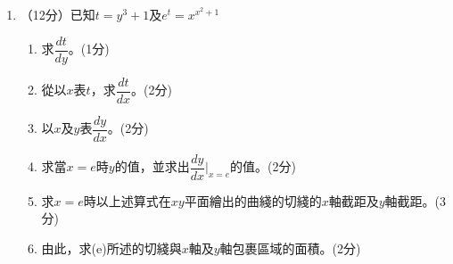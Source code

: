 \documentclass[12pt]{article}
\begin{document}
    \begin{enumerate}
        \item （12分）已知$t=y^3+1$及$e^t=x^{x^2+1}$\begin{enumerate}
            \item 求$\dfrac{dt}{dy}$。\hfill(1分)
            \item 從以$x$表$t$，求$\dfrac{dt}{dx}$。\hfill(2分)
            \item 以$x$及$y$表$\dfrac{dy}{dx}$。\hfill(2分)
            \item 求當$x=e$時$y$的值，並求出$\dfrac{dy}{dx}\bigg|_{x=e}$的值。\hfill(2分)
            \item 求$x=e$時以上述算式在$xy$平面繪出的曲綫的切綫的$x$軸截距及$y$軸截距。\hfill(3分)
            \item 由此，求(e)所述的切綫與$x$軸及$y$軸包裹區域的面積。\hfill(2分)
        \end{enumerate}

        \hrulefill

        \hrulefill

        \hrulefill

        \hrulefill

        \hrulefill

        \hrulefill

        \hrulefill

        \hrulefill

        \hrulefill

        \hrulefill

        \hrulefill

        \hrulefill

        \hrulefill

        \hrulefill

        \hrulefill

        \hrulefill

        \hrulefill

        \hrulefill

        \hrulefill

        \hrulefill

        \hrulefill

        \hrulefill

        \hrulefill

        \hrulefill

        \hrulefill

        \hrulefill

        \hrulefill


\end{enumerate}
\end{document}
